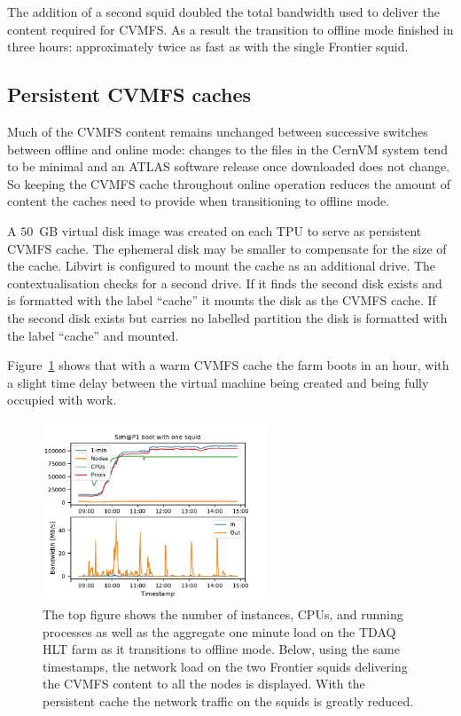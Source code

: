\documentclass{webofc}
\begin{document}
The addition of a second squid doubled the total bandwidth used to deliver the
content required for CVMFS. As a result the transition to offline mode finished
in three hours: approximately twice as fast as with the single Frontier squid.


\subsection{Persistent CVMFS caches}
\label{sec:cvmfs}
Much of the CVMFS content remains unchanged between successive switches between
offline and online mode: changes to the files in the CernVM system tend to be
minimal and an ATLAS software release once downloaded does not change. So
keeping the CVMFS cache throughout online operation reduces the
amount of content the caches need to provide when transitioning to offline mode.

A $50$~\textrm{GB} virtual disk image was created on each TPU to serve as
persistent CVMFS cache. The ephemeral disk may be smaller to
compensate for the size of the cache. Libvirt is configured to mount the cache
as an additional drive. The contextualisation checks for a second drive. If it
finds the second disk exists and is formatted with the label ``cache'' it
mounts the disk as the CVMFS cache. If the second disk exists but carries no
labelled partition the disk is formatted with the label ``cache'' and mounted.

Figure~\ref{fig:persistent_cache} shows that with a warm CVMFS cache the farm
boots in an hour, with a slight time delay between the virtual machine being
created and being fully occupied with work.
\begin{figure}[h]
\centering
\sidecaption
\includegraphics[width=0.6\textwidth,clip]{persistent_cache}
\caption{The top figure shows the number of instances, CPUs, and running
processes as well as the aggregate one minute load on the TDAQ HLT farm as it
transitions to offline mode. Below, using the same timestamps, the network load
on the two Frontier squids delivering the CVMFS content to all the nodes is
displayed. With the persistent cache the network traffic on the squids
is greatly reduced.}
\label{fig:persistent_cache}
\end{figure}
\end{document}

